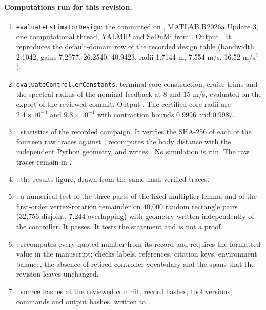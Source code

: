 \documentclass[11pt]{article}
\begin{document}
\paragraph{Computations run for this revision.}
\begin{enumerate}
\item \texttt{evaluateEstimatorDesign}: the committed
 on , MATLAB
R2026a Update 3, one computational thread, YALMIP and SeDuMi from
. Output . It reproduces the
default-domain row of the recorded design table (bandwidth 2.1042, gains
7.2977, 26.2540, 40.9423, radii 1.7144 m, 7.554 m/s, 16.52 m/s$^2$).
\item \texttt{evaluateControllerConstants}: terminal-core construction,
cruise trims and the spectral radius of the nominal feedback at 8 and
15 m/s, evaluated on the export of the reviewed commit. Output
. The certified core radii are
$2.4\times10^{-4}$ and $9.8\times10^{-4}$ with contraction bounds 0.9996
and 0.9987.
\item {}: statistics of the recorded
campaign. It verifies the SHA-256 of each of the fourteen raw traces against
, recomputes the body distance with the independent
Python geometry, and writes . No
simulation is run. The raw traces remain in
.
\item {}: the results figure,
drawn from the same hash-verified traces.
\item {}: a numerical test of the three parts of the
fixed-multiplier lemma and of the first-order vertex-rotation remainder on
40,000 random rectangle pairs (32,756 disjoint, 7,244 overlapping) with
geometry written independently of the controller. It passes. It tests the
statement and is not a proof.
\item {}: recomputes every quoted number from its
record and requires the formatted value in the manuscript; checks labels,
references, citation keys, environment balance, the absence of
retired-controller vocabulary and the spans that the revision leaves
unchanged.
\item {}: source hashes at the reviewed commit,
record hashes, tool versions, commands and output hashes, written to
.
\end{enumerate}
\end{document}
